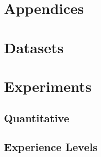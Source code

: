 \begin{appendix}
    \chapter*{Appendices}
    \label{cha:appendices}


    \chapter{Datasets}
    \label{app:datasets}
    


    \chapter{Experiments}
    \label{app:experiments}

    \section{Quantitative}
    \label{appsec:questions-and-answer}

    
    \newpage
    

    \newpage

    \section{Experience Levels}
    
    \newpage
    



\end{appendix}